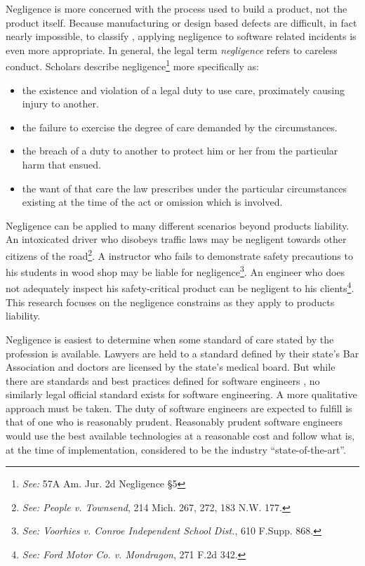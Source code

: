 \documentclass[12pt]{report}
\begin{document}
Negligence is more concerned with the process used to build a product, not the product itself. Because manufacturing or design based defects are difficult, in fact nearly impossible, to classify \cite{Turner99}, applying negligence to software related incidents is even more appropriate. In general, the legal term \textit{negligence} refers to careless conduct. Scholars describe negligence\footnote{\textit{See:} 57A Am. Jur. 2d Negligence \S 5} more specifically as:\singlespace 
\begin{itemize} 
\item the existence and violation of a legal duty to use care, proximately  
causing injury to another. 
\item the failure to exercise the degree of care demanded by the circumstances. 
\item the breach of a duty to another to protect him or her from the particular 
harm that ensued. 
\item the want of that care the law prescribes under the particular 
circumstances existing at the time of the act or omission which is involved. 
\end{itemize}\doublespace 
Negligence can be applied to many different scenarios beyond products liability. An intoxicated driver who disobeys traffic laws may be negligent towards other citizens of the road\footnote{\textit{See: People v. Townsend}, 214 Mich. 267, 272, 183 N.W. 177.}. A instructor who fails to demonstrate safety precautions to his students in wood shop may be liable for negligence\footnote{\textit{See: Voorhies v. Conroe Independent School Dist.}, 610 F.Supp. 868.}. An engineer who does not adequately inspect his safety-critical product can be negligent to his clients\footnote{\textit{See: Ford Motor Co. v. Mondragon}, 271 F.2d 342.}. This research focuses on the negligence constrains as they apply to products liability. 

Negligence is easiest to determine when some standard of care stated by the profession is available. Lawyers are held to a standard defined by their state's Bar Association and doctors are licensed by the state's medical board. But while there are standards and best practices defined for software engineers \cite{FAKE}, no similarly legal official standard exists for software engineering. A more qualitative approach must be taken. The duty of software engineers are expected to fulfill is that of one who is reasonably prudent. Reasonably prudent software engineers would use the best available technologies at a reasonable cost and follow what is, at the time of implementation, considered to be the industry ``state-of-the-art''. 
\end{document}
